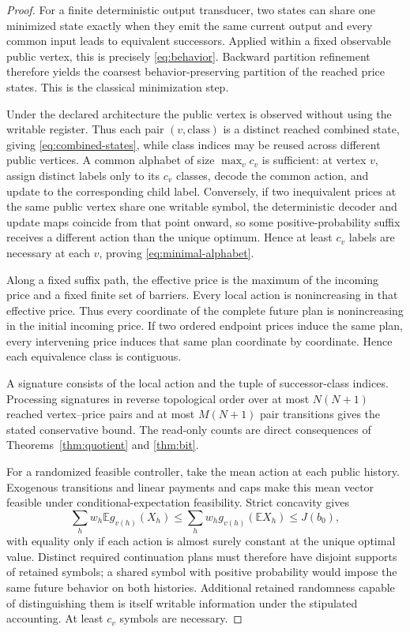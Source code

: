\begin{proof}
For a finite deterministic output transducer, two states can share one minimized state exactly when they emit the same current output and every common input leads to equivalent successors. Applied within a fixed observable public vertex, this is precisely \eqref{eq:behavior}. Backward partition refinement therefore yields the coarsest behavior-preserving partition of the reached price states. This is the classical minimization step.

Under the declared architecture the public vertex is observed without using the writable register. Thus each pair $(v,\text{class})$ is a distinct reached combined state, giving \eqref{eq:combined-states}, while class indices may be reused across different public vertices. A common alphabet of size $\max_v c_v$ is sufficient: at vertex $v$, assign distinct labels only to its $c_v$ classes, decode the common action, and update to the corresponding child label. Conversely, if two inequivalent prices at the same public vertex share one writable symbol, the deterministic decoder and update maps coincide from that point onward, so some positive-probability suffix receives a different action than the unique optimum. Hence at least $c_v$ labels are necessary at each $v$, proving \eqref{eq:minimal-alphabet}.

Along a fixed suffix path, the effective price is the maximum of the incoming price and a fixed finite set of barriers. Every local action is nonincreasing in that effective price. Thus every coordinate of the complete future plan is nonincreasing in the initial incoming price. If two ordered endpoint prices induce the same plan, every intervening price induces that same plan coordinate by coordinate. Hence each equivalence class is contiguous.

A signature consists of the local action and the tuple of successor-class indices. Processing signatures in reverse topological order over at most $N(N+1)$ reached vertex--price pairs and at most $M(N+1)$ pair transitions gives the stated conservative bound. The read-only counts are direct consequences of Theorems~\ref{thm:quotient} and \ref{thm:bit}.

For a randomized feasible controller, take the mean action at each public history. Exogenous transitions and linear payments and caps make this mean vector feasible under conditional-expectation feasibility. Strict concavity gives
\[
 \sum_hw_h\mathbb E g_{v(h)}(X_h)
 \leq \sum_hw_h g_{v(h)}(\mathbb E X_h)\leq J(b_0),
\]
with equality only if each action is almost surely constant at the unique optimal value. Distinct required continuation plans must therefore have disjoint supports of retained symbols; a shared symbol with positive probability would impose the same future behavior on both histories. Additional retained randomness capable of distinguishing them is itself writable information under the stipulated accounting. At least $c_v$ symbols are necessary.
\end{proof}

